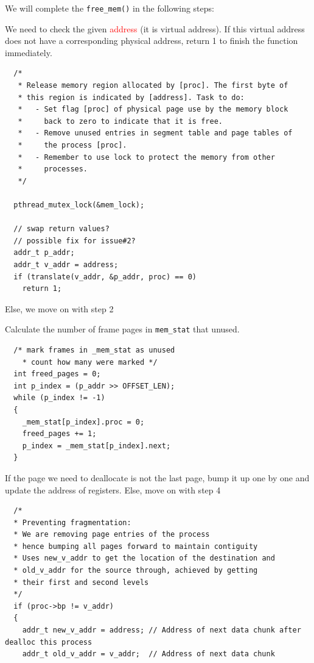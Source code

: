 \documentclass[a4paper]{article}
\numberwithin{equation}{section}
\begin{document}
We will complete the \texttt{free_mem()} in the following steps:
\begin{steps}
  \item We need to check the given \textcolor{red}{ address} (it is virtual address).
  If this virtual address does not have a corresponding physical address, return 1 to finish the function immediately.
  \begin{mdframed}[leftline=false,rightline=false,backgroundcolor=magenta!10,nobreak=false]
    \begin{verbatim}
  /*
   * Release memory region allocated by [proc]. The first byte of
   * this region is indicated by [address]. Task to do:
   *   - Set flag [proc] of physical page use by the memory block
   *     back to zero to indicate that it is free.
   *   - Remove unused entries in segment table and page tables of
   *     the process [proc].
   *   - Remember to use lock to protect the memory from other
   *     processes.
   */

  pthread_mutex_lock(&mem_lock);

  // swap return values?
  // possible fix for issue#2?
  addr_t p_addr;
  addr_t v_addr = address;
  if (translate(v_addr, &p_addr, proc) == 0)
    return 1;
    \end{verbatim}
  \end{mdframed}
  Else, we move on with step 2

  \item Calculate the number of frame pages in \texttt{mem_stat} that unused. %
  \begin{mdframed}[leftline=false,rightline=false,backgroundcolor=magenta!10,nobreak=false]
    \begin{verbatim}
  /* mark frames in _mem_stat as unused
    * count how many were marked */
  int freed_pages = 0;
  int p_index = (p_addr >> OFFSET_LEN);
  while (p_index != -1)
  {
    _mem_stat[p_index].proc = 0;
    freed_pages += 1;
    p_index = _mem_stat[p_index].next;
  }
    \end{verbatim}
  \end{mdframed}

  \item If the page we need to deallocate is not the last page, bump it up one by one and update the address of registers. %
  Else, move on with step 4
  \begin{mdframed}[leftline=false,rightline=false,backgroundcolor=magenta!10,nobreak=false]
    \begin{verbatim}
  /*
  * Preventing fragmentation:
  * We are removing page entries of the process
  * hence bumping all pages forward to maintain contiguity
  * Uses new_v_addr to get the location of the destination and
  * old_v_addr for the source through, achieved by getting
  * their first and second levels
  */
  if (proc->bp != v_addr)
  {
    addr_t new_v_addr = address; // Address of next data chunk after dealloc this process
    addr_t old_v_addr = v_addr;  // Address of next data chunk


\end{verbatim}
\end{mdframed}
\end{steps}
\end{document}
